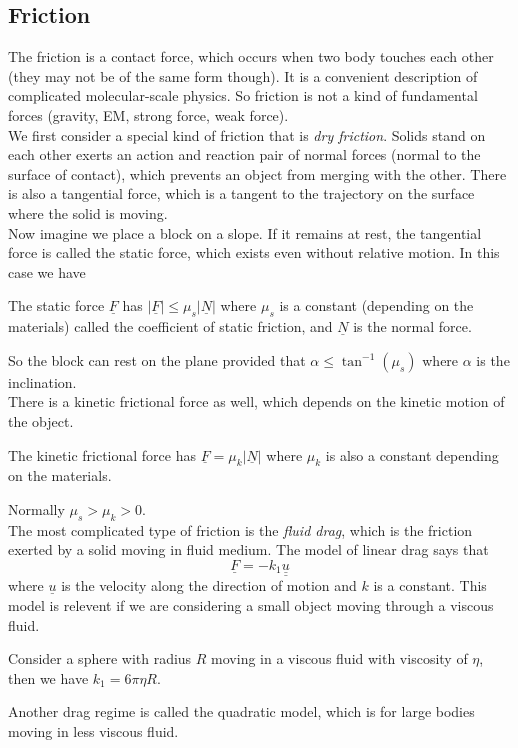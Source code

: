 \subsection{Friction}
The friction is a contact force, which occurs when two body touches each other (they may not be of the same form though).
It is a convenient description of complicated molecular-scale physics.
So friction is not a kind of fundamental forces (gravity, EM, strong force, weak force).\\
We first consider a special kind of friction that is \textit{dry friction}.
Solids stand on each other exerts an action and reaction pair of normal forces (normal to the surface of contact), which prevents an object from merging with the other.
There is also a tangential force, which is a tangent to the trajectory on the surface where the solid is moving.\\
Now imagine we place a block on a slope.
If it remains at rest, the tangential force is called the static force, which exists even without relative motion.
In this case we have
\begin{law}
    The static force $\underline{F}$ has $|\underline{F}|\le\mu_s|\underline{N}|$ where $\mu_s$ is a constant (depending on the materials) called the coefficient of static friction, and $\underline{N}$ is the normal force.
\end{law}
So the block can rest on the plane provided that $\alpha\le\tan^{-1}(\mu_s)$ where $\alpha$ is the inclination.\\
There is a kinetic frictional force as well, which depends on the kinetic motion of the object.
\begin{law}
    The kinetic frictional force has $\underline{F}=\mu_k|\underline{N}|$ where $\mu_k$ is also a constant depending on the materials.
\end{law}
Normally $\mu_s>\mu_k>0$.\\
The most complicated type of friction is the \textit{fluid drag}, which is the friction exerted by a solid moving in fluid medium.
The model of linear drag says that
$$\underline{F}=-k_1\underline{\underline{u}}$$
where $\underline{u}$ is the velocity along the direction of motion and $k$ is a constant.
This model is relevent if we are considering a small object moving through a viscous fluid.
\begin{law}
    Consider a sphere with radius $R$ moving in a viscous fluid with viscosity of $\eta$, then we have $k_1=6\pi\eta R$.
\end{law}
Another drag regime is called the quadratic model, which is for large bodies moving in less viscous fluid.

